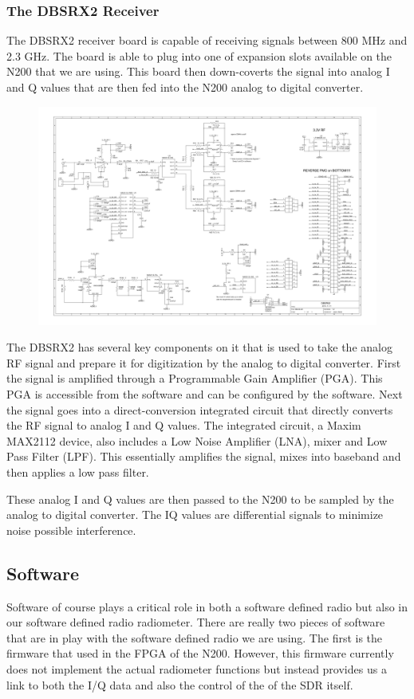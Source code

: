 \subsubsection{The DBSRX2 Receiver}
The DBSRX2 receiver board is capable of receiving signals between 800 MHz and 2.3 GHz.  The board is able to plug into one of expansion slots available on the N200 that we are using.  This board then down-coverts the signal into analog I and Q values that are then fed into the N200 analog to digital converter.

{\begin{figure}[h!tb] 
\centering
\includegraphics{Images/dbsrx2}
\label{dbsrx2}
\end{figure}
}

The DBSRX2 has several key components on it that is used to take the analog RF signal and prepare it for digitization by the analog to digital converter.  First the signal is amplified through a Programmable Gain Amplifier (PGA).  This PGA is accessible from the software and can be configured by the software.  Next the signal goes into a direct-conversion integrated circuit that directly converts the RF signal to analog I and Q values.  The integrated circuit, a Maxim MAX2112 device, also includes a Low Noise Amplifier (LNA), mixer and Low Pass Filter (LPF).  This essentially amplifies the signal, mixes into baseband and then applies a low pass filter.  

These analog I and Q values are then passed to the N200 to be sampled by the analog to digital converter.  The IQ values are differential signals to minimize noise possible interference.

\subsection{Software}
Software of course plays a critical role in both a software defined radio but also in our software defined radio radiometer.  There are really two pieces of software that are in play with the software defined radio we are using.  The first is the firmware that used in the FPGA of the N200.  However, this firmware currently does not implement the actual radiometer functions but instead provides us a link to both the I/Q data and also the control of the of the SDR itself.  

